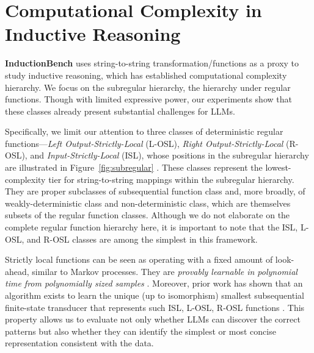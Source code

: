 \section{Computational Complexity in Inductive Reasoning}
\label{sec:com}
\textbf{InductionBench} uses string-to-string transformation/functions as a proxy to study inductive reasoning, which has established computational complexity hierarchy\citep{roche1997finite, engelfriet2001mso}. We focus on the subregular hierarchy, the hierarchy under regular functions. Though with limited expressive power, our experiments show that these classes already present substantial challenges for LLMs.

Specifically, we limit our attention to three classes of deterministic regular functions—\emph{Left Output-Strictly-Local} (L-OSL), \emph{Right Output-Strictly-Local} (R-OSL), and \emph{Input-Strictly-Local} (ISL), whose positions in the subregular hierarchy are illustrated in Figure~\ref{fig:subregular} \citep{heinz2018computational}. These classes represent
the lowest-complexity tier for string-to-string mappings within the subregular hierarchy. They are proper subclasses of subsequential function class and, more broadly, of weakly-deterministic class and non-deterministic class, which are themselves subsets of the regular function classes. Although we do not elaborate on the complete regular function hierarchy here, it is important to note that the ISL, L-OSL, and R-OSL classes are among the simplest in this framework.

Strictly local functions can be seen as operating with a fixed amount of look-ahead, similar to Markov processes. They are \emph{provably learnable in polynomial time from polynomially sized samples} \citep{chandlee2014learning, de1997characteristic, chandlee2015output, jardine2014very}. Moreover, prior work has shown that an algorithm exists to learn the unique (up to isomorphism) smallest subsequential finite-state transducer that represents such ISL, L-OSL, R-OSL functions \citep{satta1997string, arasu2009learning}. This property allows us to evaluate not only whether LLMs can discover the correct patterns but also whether they can identify the simplest or most concise representation consistent with the data. %

